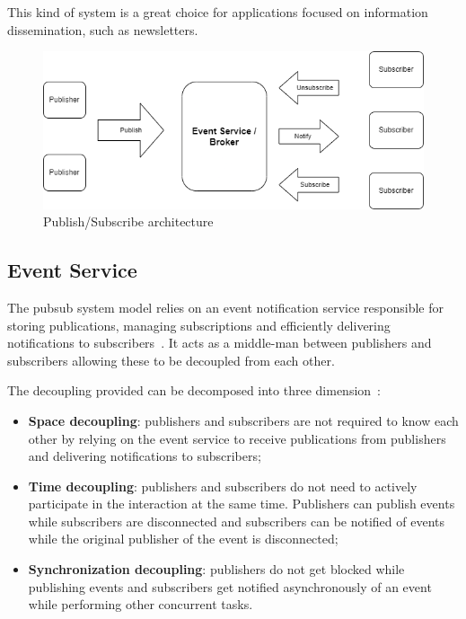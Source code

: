 This kind of system is a great choice for applications focused on information dissemination, such as newsletters.

\begin{figure}[htbp]
    \centering
    \includegraphics[width=0.8\linewidth]{Chapters/Figures/pubsub_architecture.drawio.png}
    \caption{Publish/Subscribe architecture}
    \label{fig:pub_sub_architecture}
\end{figure}

\subsection{Event Service}
\label{sec:event_service}

The \gls{pubsub} system model relies on an event notification service responsible for storing publications, managing subscriptions and efficiently delivering notifications to subscribers~\cite{faces-of-pub-sub}. It acts as a middle-man between publishers and subscribers allowing these to be decoupled from each other.

The decoupling provided can be decomposed into three dimension~\cite{faces-of-pub-sub}:

\begin{itemize}
    \item \textbf{Space decoupling}: publishers and subscribers are not required to know each other by relying on the event service to receive publications from publishers and delivering notifications to subscribers;
    \item \textbf{Time decoupling}: publishers and subscribers do not need to actively participate in the interaction at the same time. Publishers can publish events while subscribers are disconnected and subscribers can be notified of events while the original publisher of the event is disconnected;
    \item \textbf{Synchronization decoupling}: publishers do not get blocked while publishing events and subscribers get notified asynchronously of an event while performing other concurrent tasks.
\end{itemize}

